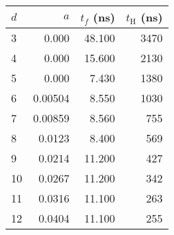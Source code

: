 \begin{tabular}{| l | r r r |}
  \hline
  $d$ & $a$ & $t_f$ (ns) & $t_\text{H}$ (ns) \\
  \hline
   3 &    0.000 &    48.100 &    3470 \\
   4 &    0.000 &    15.600 &    2130 \\
   5 &    0.000 &    7.430 &    1380 \\
   6 &    0.00504 &    8.550 &    1030 \\
   7 &    0.00859 &    8.560 &    755 \\
   8 &    0.0123 &    8.400 &    569 \\
   9 &    0.0214 &    11.200 &    427 \\
   10 &    0.0267 &    11.200 &    342 \\
   11 &    0.0316 &    11.100 &    263 \\
   12 &    0.0404 &    11.100 &    255 \\
  \hline
\end{tabular}
